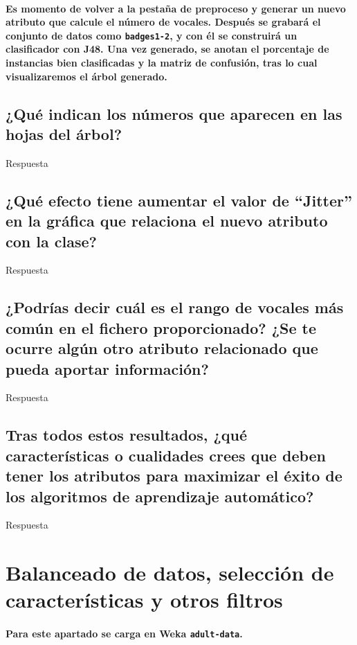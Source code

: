 \documentclass[12pt]{article}
\begin{document}
\paragraph{\small Es momento de volver a la pestaña de preproceso y generar un
nuevo atributo que calcule el número de vocales. Después se grabará el conjunto
de datos como \texttt{badges1-2}, y con él se construirá un clasificador
con J48. Una vez generado, se anotan el porcentaje de instancias bien
clasificadas y la matriz de confusión, tras lo cual visualizaremos el árbol
generado.}

\subsection*{\small ¿Qué indican los números que aparecen en las hojas del
árbol?}

Respuesta

\subsection*{\small ¿Qué efecto tiene aumentar el valor de ``Jitter'' en la
gráfica que relaciona el nuevo atributo con la clase?}

Respuesta

\subsection*{\small ¿Podrías decir cuál es el rango de vocales más común en el
fichero proporcionado? ¿Se te ocurre algún otro atributo relacionado que pueda
aportar información?}

Respuesta

\subsection*{\small Tras todos estos resultados, ¿qué características o
cualidades crees que deben tener los atributos para maximizar el éxito de los
algoritmos de aprendizaje automático?}

Respuesta

\newpage

\section{Balanceado de datos, selección de características y otros filtros}

\paragraph{\small Para este apartado se carga en Weka \texttt{adult-data}.}
\end{document}
